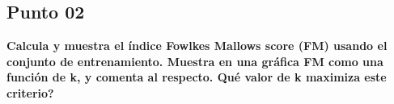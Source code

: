\subsection*{Punto 02}

\textbf{Calcula y muestra el índice Fowlkes Mallows score (FM) usando el conjunto de entrenamiento. Muestra en una gráfica FM como una función de k, y comenta al respecto. Qué valor de k maximiza este criterio?}